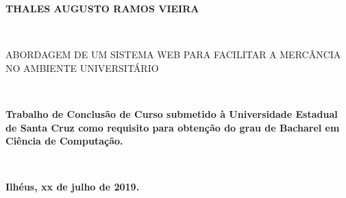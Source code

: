 
%
% 
%
\begin{folhadeaprovacao}


\begin{center}

    {\large \begin{large} \bfseries THALES AUGUSTO RAMOS VIEIRA \end{large}\\}
    \vspace{4cm}
    {\large\bfseries{\begin{large}ABORDAGEM DE UM SISTEMA WEB PARA FACILITAR A MERCÂNCIA NO AMBIENTE UNIVERSITÁRIO \end{large}}\\}
    \vspace{1cm}
    \hspace{.45\linewidth}
    \begin{minipage}{.50\linewidth}

            \textbf{Trabalho de Conclusão de Curso submetido à Universidade Estadual de Santa Cruz  como requisito 
            para obtenção do grau de Bacharel em Ciência de Computação. }
    \end{minipage}
    \\
\end{center}
    \textbf{Ilhéus, xx de julho de 2019.}
\begin{center}
           

    \bfseries{}
\end{center}


    \vspace{2.5cm}
    \vspace{3 cm}%

  
\end{folhadeaprovacao}
